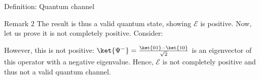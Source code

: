 \documentclass[a4paper]{article}
\begin{document}
\begin{parag}{Definition: Quantum channel}
\begin{subparag}{Remark 2}
        The result is thus a valid quantum state, showing $\mathcal{E}$ is positive. Now, let us prove it is not completely positive. Consider: 

        However, this is not positive: $\ket{\Psi^-} = \frac{\ket{01} - \ket{10}}{\sqrt{2}}$ is an eigenvector of this operator with a negative eigenvalue. Hence, $\mathcal{E}$ is not completely positive and thus not a valid quantum channel.
    \end{subparag}
\end{parag}
\end{document}
